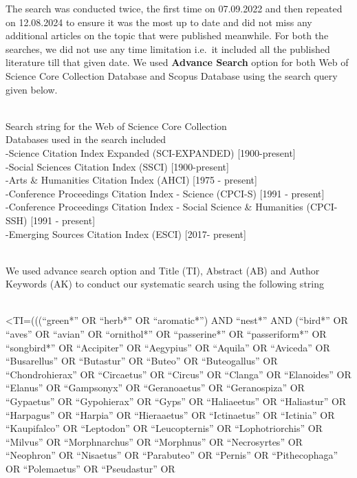 \documentclass[
  number,
  review,
  onecolumn]{elsarticle}
\begin{document}
The search was conducted twice, the first time on 07.09.2022 and then
repeated on 12.08.2024 to ensure it was the most up to date and did not
miss any additional articles on the topic that were published meanwhile.
For both the searches, we did not use any time limitation i.e.~it
included all the published literature till that given date. We used
\textbf{Advance Search} option for both Web of Science Core Collection
Database and Scopus Database using the search query given below.\\
\strut \\
Search string for the Web of Science Core Collection\\
Databases used in the search included\\
-Science Citation Index Expanded (SCI-EXPANDED) {[}1900-present{]}\\
-Social Sciences Citation Index (SSCI) {[}1900-present{]}\\
-Arts \& Humanities Citation Index (AHCI) {[}1975 - present{]}\\
-Conference Proceedings Citation Index - Science (CPCI-S) {[}1991 -
present{]}\\
-Conference Proceedings Citation Index - Social Science \& Humanities
(CPCI-SSH) {[}1991 - present{]}\\
-Emerging Sources Citation Index (ESCI) {[}2017- present{]}\\
\strut \\
We used advance search option and Title (TI), Abstract (AB) and Author
Keywords (AK) to conduct our systematic search using the following
string\\
\strut \\
\textless TI=(((``green*'' OR ``herb*'' OR ``aromatic*'') AND ``nest*''
AND (``bird*'' OR ``aves'' OR ``avian'' OR ``ornithol*'' OR
``passerine*'' OR ``passeriform*'' OR ``songbird*'' OR ``Accipiter'' OR
``Aegypius'' OR ``Aquila'' OR ``Aviceda'' OR ``Busarellus'' OR
``Butastur'' OR ``Buteo'' OR ``Buteogallus'' OR ``Chondrohierax'' OR
``Circaetus'' OR ``Circus'' OR ``Clanga'' OR ``Elanoides'' OR ``Elanus''
OR ``Gampsonyx'' OR ``Geranoaetus'' OR ``Geranospiza'' OR ``Gypaetus''
OR ``Gypohierax'' OR ``Gyps'' OR ``Haliaeetus'' OR ``Haliastur'' OR
``Harpagus'' OR ``Harpia'' OR ``Hieraaetus'' OR ``Ictinaetus'' OR
``Ictinia'' OR ``Kaupifalco'' OR ``Leptodon'' OR ``Leucopternis'' OR
``Lophotriorchis'' OR ``Milvus'' OR ``Morphnarchus'' OR ``Morphnus'' OR
``Necrosyrtes'' OR ``Neophron'' OR ``Nisaetus'' OR ``Parabuteo'' OR
``Pernis'' OR ``Pithecophaga'' OR ``Polemaetus'' OR ``Pseudastur'' OR
\end{document}
